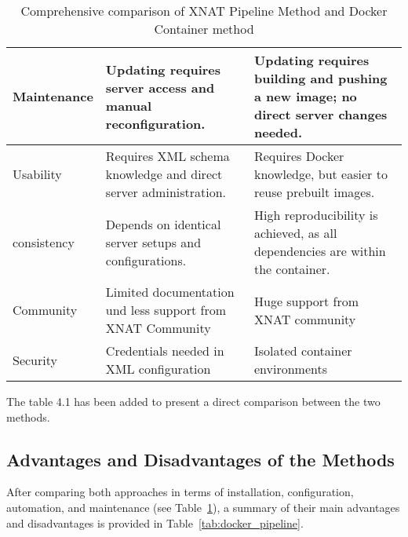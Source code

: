 \begin{table}[H]
\begin{tabular}{|>{\centering\arraybackslash}p{4cm}|
                    >{\centering\arraybackslash}p{5cm}|
                    >{\centering\arraybackslash}p{5cm}|}
Maintenance & Updating requires server access and manual reconfiguration.& Updating requires building and pushing a new image; no direct server changes needed.\\ \hline
Usability& Requires XML schema knowledge and direct server administration.& Requires Docker knowledge, but easier to reuse prebuilt images.\\ \hline
consistency& Depends on identical server setups and configurations.& High reproducibility is achieved, as all dependencies are within the container.\\ \hline
Community& Limited documentation und less support from XNAT Community& Huge support from XNAT community\\ \hline
Security& Credentials needed in XML configuration& Isolated container environments\\ \hline
    \end{tabular}
    \caption{Comprehensive comparison of XNAT Pipeline Method and Docker Container method}
    \label{tab:pipeline-vs-docker}
\end{table}
 The table 4.1 has been added to present a direct comparison between the two methods.


 
 \subsection{Advantages and Disadvantages of the Methods}

After comparing both approaches in terms of installation, configuration, automation, and maintenance (see Table~\ref{tab:pipeline-vs-docker}), a summary of their main advantages and disadvantages is provided in Table~\ref{tab:docker_pipeline}.

